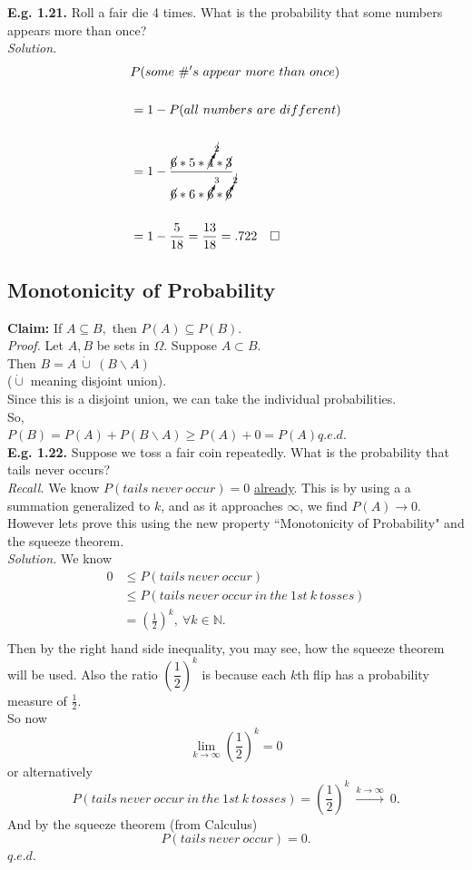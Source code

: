 \documentclass[12pt]{book}
\begin{document}
\noindent \textbf{E.g. 1.21. } Roll a fair die 4 times. What is the probability that some numbers appears more than once?\\
\textit{Solution. }
$$
\begin{aligned}
&P(some~\#'s~appear~more~than~once)\\\\
&=1-P(all~numbers~are~different)\\\\
&=1-\frac{\cancel{6}*5*\cancelto{\cancel{2}}{4}*\cancel{3}}{\cancel{6}*6*\cancelto{3}{6}*\cancelto{\cancel{2}}{6}}\\\\
&=1-\frac{5}{18} = \frac{13}{18}=.722~~~\square
\end{aligned}
$$




\subsection{Monotonicity of Probability}
\textbf{Claim:} If $A\subseteq B,$ then $P(A)\subseteq P(B)$.\\
\textit{Proof.} 
Let $A,B$ be sets in $\Omega$.
Suppose $A\subset B$.\\
Then $B=A~\dot{\cup}~(B\backslash A)$\\
($\dot{\cup}$ meaning disjoint union).\\
Since this is a disjoint union, we can take the individual probabilities.\\
So,\\
$P(B)=P(A)+P(B\backslash A) \geq P(A) +0 =P(A)$\hfill $q.e.d.$\\

\noindent \textbf{E.g. 1.22. } Suppose we toss a fair coin repeatedly. What is the probability that tails never occurs?\\
\textit{Recall. } We know $P(tails~never~occur)=0$ \hyperlink{infinitely many outcomes}{already}. This is by using a a summation generalized to $k$, and as it approaches $\infty$, we find $P(A)\to 0$.\\
However lets prove this using the new property ``Monotonicity of Probability" and the squeeze theorem.\\

\noindent \textit{Solution. } 
We know
\begin{align*}
0&\leq P(tails~never~occur) \\
&\leq P(tails~never~occur~in~the~1st~k~tosses)\\
&=\left(\frac{1}{2}\right)^{k},~\forall k\in \mathbb{N}.\\
\end{align*}
Then by the right hand side inequality, you may see, how the squeeze theorem will be used. Also the ratio $\left(\dfrac{1}{2}\right)^{k}$ is because each $k$th flip has a probability measure of $\frac{1}{2}$.\\
So now 
$$\lim\limits_{k\to \infty} \left(\frac{1}{2}\right)^{k}=0$$
or alternatively 
$$P(tails~never~occur~in~the~1st~k~tosses)=\left(\frac{1}{2}\right)^{k} ~\xrightarrow{k\to \infty}~0.$$
And by the squeeze theorem (from Calculus)
$$P(tails~never~occur)=0.$$\hfill$q.e.d.$
\end{document}
